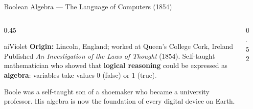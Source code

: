 \begin{frame}[shrink=8]{Boolean Algebra --- The Language of Computers (1854)}

  \begin{columns}[T]
    \begin{column}{0.45\textwidth}
      \begin{personbox}{aiViolet}
        \textbf{Origin:} Lincoln, England; worked at Queen's College
        Cork, Ireland\\[3pt]
        Published \emph{An Investigation of the Laws of Thought} (1854).
        Self-taught mathematician who showed that \textbf{logical
        reasoning} could be expressed as \textbf{algebra}: variables
        take values 0 (false) or 1 (true).
      \end{personbox}

      \vspace{0.3em}
      \begin{insightbox}
        Boole was a self-taught son of a shoemaker who became a
        university professor. His algebra is now the foundation of every
        digital device on Earth.
      \end{insightbox}
    \end{column}

    \begin{column}{0.52\textwidth}
\end{column}
\end{columns}
\end{frame}
